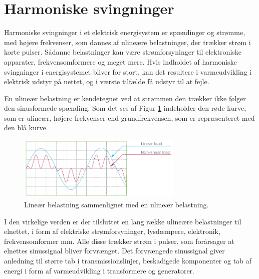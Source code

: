 
\section{Harmoniske svingninger}
\label{sec:THD}
Harmoniske svingninger i et elektrisk energisystem er spændinger og strømme, med højere frekvenser, som dannes af ulineære belastninger, der trækker strøm i korte pulser. Sådanne belastninger kan være strømforsyninger til elektroniske apparater, frekvensomformere og meget mere. Hvis indholdet af harmoniske svingninger i energisystemet bliver for stort, kan det resultere i varmeudvikling i elektrisk udstyr på nettet, og i værste tilfælde få udstyr til at fejle. \newline

En ulineær belastning er kendetegnet ved at strømmen den trækker ikke følger den sinusformede spænding.  Som det ses af Figur \ref{fig:nonLinear} indeholder den røde kurve, som er ulineær, højere frekvenser end grundfrekvensen, som er repræsenteret med den blå kurve. 


\begin{figure}[H] %
	\centering
	\includegraphics[width=0.7\textwidth]{figure/nonLinear}
	\caption{Lineær belastning sammenlignet med en ulineær belastning.}
	\label{fig:nonLinear}
\end{figure}

I den virkelige verden er der tilsluttet en lang række ulineære belastninger til elnettet, i form af elektriske strømforsyninger, lysdæmpere, elektronik, frekvensomformer mm. Alle disse trækker strøm i pulser, som forårsager at elnettes sinussignal bliver forvrænget. Det forvrængede sinussignal giver anledning til større tab i transmissionslinjer, beskadigede komponenter og tab af energi i form af varmeudvikling i transformere og generatorer. \newline

